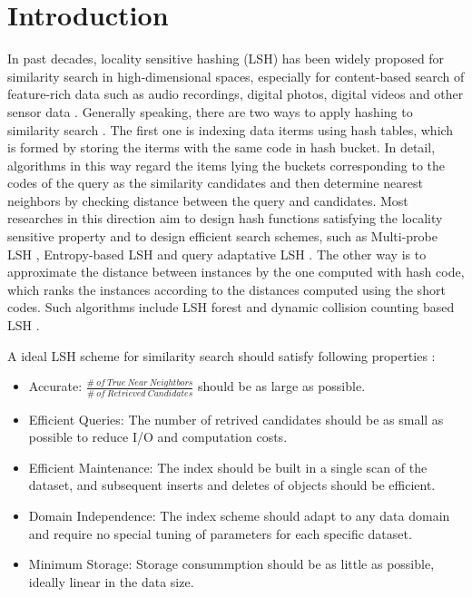 \section{Introduction}
In past decades, locality sensitive hashing (LSH) has been widely proposed for similarity search in high-dimensional spaces, especially for content-based search of feature-rich data such as audio recordings, digital photos, digital videos and other sensor data \cite{lv2007multi}. Generally speaking, there are two ways to apply hashing to similarity search \cite{wang2014hashing}. The first one is indexing data iterms using hash tables, which is formed by storing the iterms with the same code in hash bucket. In detail, algorithms in this way regard the items lying the buckets corresponding to the codes of the query as the similarity candidates and then determine nearest neighbors by checking distance between the query and candidates. Most researches in this direction aim to design hash functions satisfying the locality sensitive property and to design efficient search schemes, such as Multi-probe LSH \cite{lv2007multi}, Entropy-based LSH \cite{panigrahy2006entropy} and query adaptative LSH \cite{jegou2008query}. The other way is to approximate the distance between instances by the one computed with hash code, which ranks the instances according to the distances computed using the short codes. Such algorithms include LSH forest \cite{bawa2005lsh} and dynamic collision counting based LSH \cite{gan2012locality}.

A ideal LSH scheme for similarity search should satisfy following properties \cite{bawa2005lsh, lv2007multi}:

\begin{itemize}
	\item Accurate: $\frac{\#\ of\ True\ Near\ Neightbors}{\#\ of\ Retrieved\ Candidates}$ should be as large as possible.
	\item {Efficient Queries}: The number of retrived candidates should be as small as possible to reduce I/O and computation costs.
	\item {Efficient Maintenance}: The index should be built in a single scan of the dataset, and subsequent inserts and deletes of objects should be efficient.
	\item  {Domain Independence}: The index scheme should adapt to any data domain and require no special tuning of parameters for each specific dataset.
	\item  {Minimum Storage}: Storage consummption should be as little as possible, ideally linear in the data size.
\end{itemize}